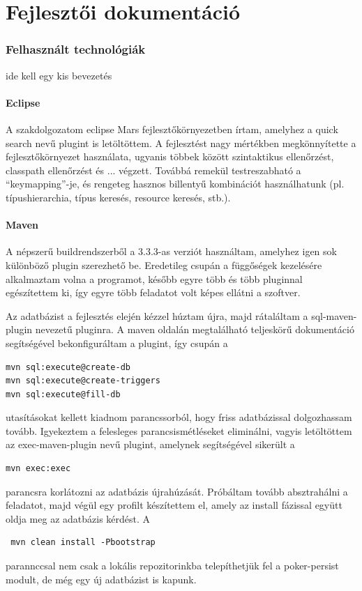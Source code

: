 \part{Fejlesztői dokumentáció}

\section{Felhasznált technológiák}
ide kell egy kis bevezetés

\subsection{Eclipse}
A szakdolgozatom eclipse Mars \cite{eclipse_mars} fejlesztőkörnyezetben írtam, amelyhez a quick search \cite{quick_search} nevű plugint is letöltöttem. A fejlesztést nagy mértékben megkönnyítette a fejlesztőkörnyezet használata, ugyanis többek között szintaktikus ellenőrzést, classpath ellenőrzést és ... végzett. Továbbá remekül testreszabható a ``keymapping''-je, és rengeteg hasznos billentyű kombinációt használhatunk (pl. típushierarchia, típus keresés, resource keresés, stb.).

\subsection{Maven}
A népszerű buildrendszerből a 3.3.3-as verziót használtam, amelyhez igen sok különböző plugin szerezhető be. Eredetileg csupán a függőségek kezelésére alkalmaztam volna a programot, később egyre több és több pluginnal egészítettem ki, így egyre több feladatot volt képes ellátni a szoftver.

Az adatbázist a fejlesztés elején kézzel húztam újra, majd rátaláltam a sql-maven-plugin nevezetű pluginra. A maven oldalán megtalálható teljeskörű dokumentáció segítségével bekonfiguráltam a plugint, így csupán a
 \begin{verbatim}
mvn sql:execute@create-db
mvn sql:execute@create-triggers
mvn sql:execute@fill-db
\end{verbatim}
utasításokat kellett kiadnom parancssorból, hogy friss adatbázissal dolgozhassam tovább. Igyekeztem a felesleges parancsismétléseket eliminálni, vagyis letöltöttem az exec-maven-plugin nevű plugint, amelynek segítségével sikerült a 
 \begin{verbatim}
mvn exec:exec
\end{verbatim}
parancsra korlátozni az adatbázis újrahúzását. Próbáltam tovább absztrahálni a feladatot, majd végül egy profilt készítettem el, amely az install fázissal együtt oldja meg az adatbázis kérdést. A 
 \begin{verbatim}
 mvn clean install -Pbootstrap
 \end{verbatim}
parannccsal nem csak a lokális repozitorinkba telepíthetjük fel a poker-persist modult, de még egy új adatbázist is kapunk.


